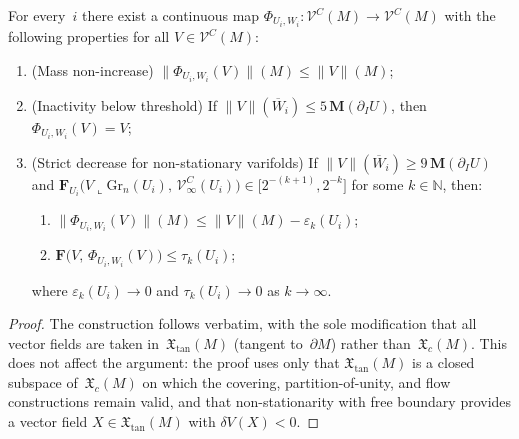 \begin{lemma}\label{lem:extend-pull-tight}
For every~$i$ there exist a continuous map $\Phi_{U_i,W_i}:\mathcal{V}^C(M)\to\mathcal{V}^C(M)$ with the following properties for all $V\in\mathcal{V}^C(M)$:
\begin{enumerate}
    \item \textup{(Mass non-increase)} $\|\Phi_{U_i,W_i}(V)\|(M)\le \|V\|(M)$;
    \item \textup{(Inactivity below threshold)} If $\|V\|(\overline{W}_i)\le 5\,\mathbf{M}(\partial_IU)$, then $\Phi_{U_i,W_i}(V)=V$;
    \item \textup{(Strict decrease for non-stationary varifolds)} If $\|V\|(\overline{W}_i)\ge 9\,\mathbf{M}(\partial_IU)$ and $\mathbf{F}_{U_i}\bigl(V\llcorner \mathrm{Gr}_n(U_i),\,\mathcal{V}^C_\infty(U_i)\bigr)\in\bigl[2^{-(k+1)},2^{-k}\bigr]$ for some $k\in\mathbb{N}$, then:
    \begin{enumerate}[label=\textup{(\alph*)}]
        \item $\|\Phi_{U_i,W_i}(V)\|(M) \le \|V\|(M) - \varepsilon_k(U_i)$;
        \item $\mathbf{F}\bigl(V,\,\Phi_{U_i,W_i}(V)\bigr)\le\tau_k(U_i)$;
    \end{enumerate}
    where $\varepsilon_k(U_i)\to 0$ and $\tau_k(U_i)\to 0$ as $k\to\infty$.
\end{enumerate}
\end{lemma}

\begin{proof}
The construction follows \cite[Lemma~2.3]{CL20} verbatim, with the sole modification that all vector fields are taken in~$\mathfrak{X}_{\mathrm{tan}}(M)$ (tangent to~$\partial M$) rather than~$\mathfrak{X}_c(M)$. This does not affect the argument: the proof uses only that $\mathfrak{X}_{\mathrm{tan}}(M)$ is a closed subspace of~$\mathfrak{X}_c(M)$ on which the covering, partition-of-unity, and flow constructions remain valid, and that non-stationarity with free boundary provides a vector field $X\in\mathfrak{X}_{\mathrm{tan}}(M)$ with $\delta V(X)<0$.
\end{proof}

